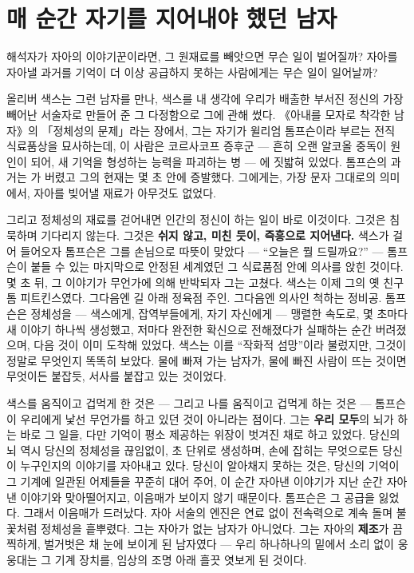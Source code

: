\section*{매 순간 자기를 지어내야 했던 남자}

해석자가 자아의 이야기꾼이라면, 그 원재료를 빼앗으면 무슨 일이 벌어질까? 자아를 자아낼 과거를 기억이 더 이상 공급하지 못하는 사람에게는 무슨 일이 일어날까?

올리버 색스는 그런 남자를 만나, 색스를 내 생각에 우리가 배출한 부서진 정신의 가장 빼어난 서술자로 만들어 준 그 다정함으로 그에 관해 썼다. 《아내를 모자로 착각한 남자》의 「정체성의 문제」라는 장에서, 그는 자기가 윌리엄 톰프슨이라 부르는 전직 식료품상을 묘사하는데, 이 사람은 코르사코프 증후군 — 흔히 오랜 알코올 중독이 원인이 되어, 새 기억을 형성하는 능력을 파괴하는 병 — 에 짓밟혀 있었다. 톰프슨의 과거는 가 버렸고 그의 현재는 몇 초 안에 증발했다. 그에게는, 가장 문자 그대로의 의미에서, 자아를 빚어낼 재료가 아무것도 없었다.

그리고 정체성의 재료를 걷어내면 인간의 정신이 하는 일이 바로 이것이다. 그것은 침묵하며 기다리지 않는다. 그것은 \textbf{쉬지 않고, 미친 듯이, 즉흥으로 지어낸다.} 색스가 걸어 들어오자 톰프슨은 그를 손님으로 따뜻이 맞았다 — ``오늘은 뭘 드릴까요?'' — 톰프슨이 붙들 수 있는 마지막으로 안정된 세계였던 그 식료품점 안에 의사를 앉힌 것이다. 몇 초 뒤, 그 이야기가 무언가에 의해 반박되자 그는 고쳤다. 색스는 이제 그의 옛 친구 톰 피트킨스였다. 그다음엔 길 아래 정육점 주인. 그다음엔 의사인 척하는 정비공. 톰프슨은 정체성을 — 색스에게, 잡역부들에게, 자기 자신에게 — 맹렬한 속도로, 몇 초마다 새 이야기 하나씩 생성했고, 저마다 완전한 확신으로 전해졌다가 실패하는 순간 버려졌으며, 다음 것이 이미 도착해 있었다. 색스는 이를 ``작화적 섬망''이라 불렀지만, 그것이 정말로 무엇인지 똑똑히 보았다. 물에 빠져 가는 남자가, 물에 빠진 사람이 뜨는 것이면 무엇이든 붙잡듯, 서사를 붙잡고 있는 것이었다.

색스를 움직이고 겁먹게 한 것은 — 그리고 나를 움직이고 겁먹게 하는 것은 — 톰프슨이 우리에게 낯선 무언가를 하고 있던 것이 아니라는 점이다. 그는 \textbf{우리 모두}의 뇌가 하는 바로 그 일을, 다만 기억이 평소 제공하는 위장이 벗겨진 채로 하고 있었다. 당신의 뇌 역시 당신의 정체성을 끊임없이, 초 단위로 생성하며, 손에 잡히는 무엇으로든 당신이 누구인지의 이야기를 자아내고 있다. 당신이 알아채지 못하는 것은, 당신의 기억이 그 기계에 일관된 어제들을 꾸준히 대어 주어, 이 순간 자아낸 이야기가 지난 순간 자아낸 이야기와 맞아떨어지고, 이음매가 보이지 않기 때문이다. 톰프슨은 그 공급을 잃었다. 그래서 이음매가 드러났다. 자아 서술의 엔진은 연료 없이 전속력으로 계속 돌며 불꽃처럼 정체성을 흩뿌렸다. 그는 자아가 없는 남자가 아니었다. 그는 자아의 \textbf{제조}가 끔찍하게, 벌거벗은 채 눈에 보이게 된 남자였다 — 우리 하나하나의 밑에서 소리 없이 웅웅대는 그 기계 장치를, 임상의 조명 아래 흘끗 엿보게 된 것이다.

